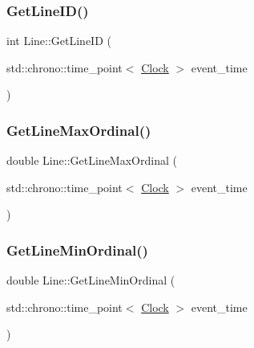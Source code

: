\mbox{\label{classLine_a20756feda4d42032955ec6cf12d89941}} 
\subsubsection{\texorpdfstring{Get\+Line\+I\+D()}{GetLineID()}}
{\footnotesize\ttfamily int Line\+::\+Get\+Line\+ID (\begin{DoxyParamCaption}\item[{std\+::chrono\+::time\+\_\+point$<$ \mbox{\hyperlink{universe_8h_a0ef8d951d1ca5ab3cfaf7ab4c7a6fd80}{Clock}} $>$}]{event\+\_\+time }\end{DoxyParamCaption})\hspace{0.3cm}{\ttfamily [inline]}}

\mbox{\label{classLine_a3fc7779998759b641ec2b7bc8515563a}} 
\subsubsection{\texorpdfstring{Get\+Line\+Max\+Ordinal()}{GetLineMaxOrdinal()}}
{\footnotesize\ttfamily double Line\+::\+Get\+Line\+Max\+Ordinal (\begin{DoxyParamCaption}\item[{std\+::chrono\+::time\+\_\+point$<$ \mbox{\hyperlink{universe_8h_a0ef8d951d1ca5ab3cfaf7ab4c7a6fd80}{Clock}} $>$}]{event\+\_\+time }\end{DoxyParamCaption})\hspace{0.3cm}{\ttfamily [inline]}}

\mbox{\label{classLine_a7b105f0af704489446cc93302c30813d}} 
\subsubsection{\texorpdfstring{Get\+Line\+Min\+Ordinal()}{GetLineMinOrdinal()}}
{\footnotesize\ttfamily double Line\+::\+Get\+Line\+Min\+Ordinal (\begin{DoxyParamCaption}\item[{std\+::chrono\+::time\+\_\+point$<$ \mbox{\hyperlink{universe_8h_a0ef8d951d1ca5ab3cfaf7ab4c7a6fd80}{Clock}} $>$}]{event\+\_\+time }\end{DoxyParamCaption})\hspace{0.3cm}{\ttfamily [inline]}}

